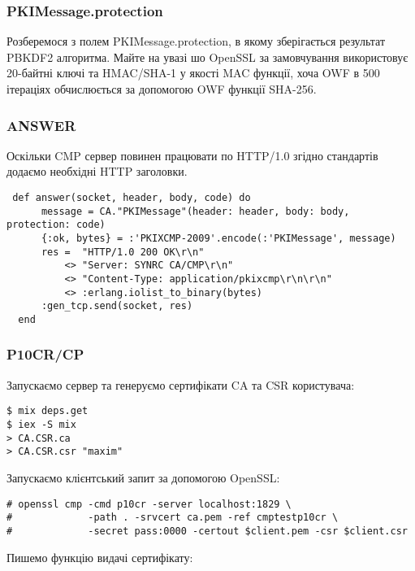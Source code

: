\newpage
\subsubsection{PKIMessage.protection}

Розберемося з полем PKIMessage.protection, в якому зберігається результат PBKDF2 алгоритма. Майте на увазі шо OpenSSL за замовчування використовує 20-байтні ключі та HMAC/SHA-1 у якості MAC функції, хоча OWF в 500 ітераціях обчислюється за допомогою OWF функції SHA-256.

\subsubsection{ANSWER}

Оскільки CMP сервер повинен працювати по HTTP/1.0 згідно стандартів додаємо необхідні HTTP заголовки.

\begin{lstlisting}
 def answer(socket, header, body, code) do
      message = CA."PKIMessage"(header: header, body: body, protection: code)
      {:ok, bytes} = :'PKIXCMP-2009'.encode(:'PKIMessage', message)
      res =  "HTTP/1.0 200 OK\r\n"
          <> "Server: SYNRC CA/CMP\r\n"
          <> "Content-Type: application/pkixcmp\r\n\r\n"
          <> :erlang.iolist_to_binary(bytes)
      :gen_tcp.send(socket, res)
  end
\end{lstlisting}

\subsubsection{P10CR/CP}

Запускаємо сервер та генеруємо сертифікати CA та CSR користувача:

\begin{lstlisting}
$ mix deps.get
$ iex -S mix
> CA.CSR.ca
> CA.CSR.csr "maxim"
\end{lstlisting}

Запускаємо клієнтський запит за допомогою OpenSSL:

\begin{lstlisting}
# openssl cmp -cmd p10cr -server localhost:1829 \
#             -path . -srvcert ca.pem -ref cmptestp10cr \
#             -secret pass:0000 -certout $client.pem -csr $client.csr
\end{lstlisting}

\newpage
Пишемо функцію видачі сертифікату:

